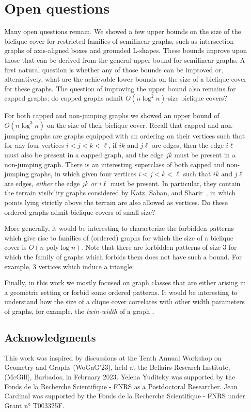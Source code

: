 \documentclass{amsart}
\begin{document}
\section{Open questions}

Many open questions remain. We showed a few upper bounds on the size of the biclique cover for restricted families of semilinear graphs, such as intersection graphs of axis-aligned boxes and grounded L-shapes. These bounds improve upon those that can be derived from the general upper bound for semilinear graphs. A first natural question is whether any of those bounds can be improved or, alternatively, what are the achievable lower bounds on the size of a biclique cover for these graphs. The question of improving the upper bound also remains for capped graphs; do capped graphs admit $O(n\log^2 n)$-size biclique covers?

For both capped and non-jumping graphs we showed an upper bound of $O(n \log^3 n)$ on the size of their biclique cover. Recall that capped and non-jumping graphs are graphs equipped with an ordering on their vertices such that for any four vertices $i<j<k<\ell$, if $ik$ and $j\ell$ are edges, then the edge $i \ell$ must also be present in a capped graph, and the edge $jk$ must be present in a non-jumping graph.
There is an interesting superclass of both capped and non-jumping graphs, in which given four vertices $i<j<k<\ell$ such that $ik$ and $j\ell$ are edges, \emph{either} the edge $jk$ \emph{or} $i\ell$ must be present. In particular, they contain the terrain visibility graphs considered by Katz, Saban, and Sharir~\cite{KSS24}, in which points lying strictly above the terrain are also allowed as vertices. Do these ordered graphs admit biclique covers of small size? 

More generally, it would be interesting to characterize the forbidden patterns which give rise to families of (ordered) graphs for which the size of a biclique cover is $O(n \text{ poly}\log n)$. Note that there are forbidden patterns of size $3$ for which the family of graphs which forbids them does not have such a bound. For example, $3$ vertices which induce a triangle. 

Finally, in this work we mostly focused on graph classes that are either arising in a geometric setting or forbid some ordered patterns. It would be interesting to understand how the size of a clique cover correlates with other width parameters of graphs, for example, the {\em twin-width} of a graph \cite{BKTW21}. 

\subsection*{Acknowledgments}
This work was inspired by discussions at the Tenth Annual Workshop on Geometry and Graphs (WoGaG’23), held at the Bellairs Research Institute, (McGill), Barbados, in February 2023. Yelena Yuditsky was supported by the Fonds de la Recherche Scientifique - FNRS as a Postdoctoral Researcher. Jean Cardinal was supported by the Fonds de la Recherche Scientifique - FNRS under Grant n° T003325F.



\end{document}
